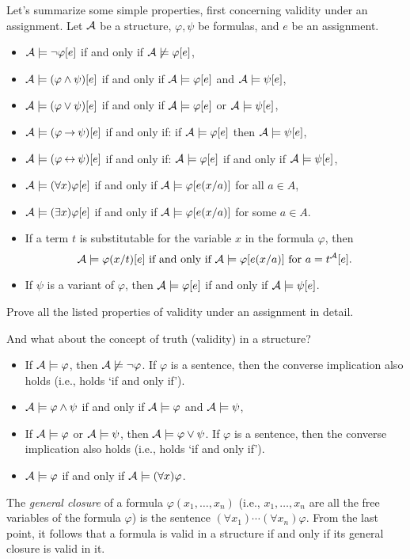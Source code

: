 Let's summarize some simple properties, first concerning validity under an assignment. Let $\mathcal{A}$ be a structure, $\varphi,\psi$ be formulas, and $e$ be an assignment.
\begin{itemize}
    \item $\mathcal{A}\models\neg\varphi[e]$ if and only if $\mathcal{A}\not\models\varphi[e]$,
    \item $\mathcal{A}\models(\varphi\land\psi)[e]$ if and only if $\mathcal{A}\models\varphi[e]$ and $\mathcal{A}\models\psi[e]$,
    \item $\mathcal{A}\models(\varphi\lor\psi)[e]$ if and only if $\mathcal{A}\models\varphi[e]$ or $\mathcal{A}\models\psi[e]$,
    \item $\mathcal{A}\models(\varphi\mathbin{\rightarrow}\psi)[e]$ if and only if: if $\mathcal{A}\models\varphi[e]$ then $\mathcal{A}\models\psi[e]$,
    \item $\mathcal{A}\models(\varphi\mathbin{\leftrightarrow}\psi)[e]$ if and only if: $\mathcal{A}\models\varphi[e]$ if and only if $\mathcal{A}\models\psi[e]$,
    \item $\mathcal{A}\models(\forall x)\varphi[e]$ if and only if $\mathcal{A}\models\varphi[e(x/a)]$ for all $a\in A$,
    \item $\mathcal{A}\models(\exists x)\varphi[e]$ if and only if $\mathcal{A}\models\varphi[e(x/a)]$ for some $a\in A$.
    \item If a term $t$ is substitutable for the variable $x$ in the formula $\varphi$, then
    $$
    \mathcal{A}\models\varphi(x/t)[e]\text{ if and only if }\mathcal{A}\models\varphi[e(x/a)]\text{ for }a=t^{\mathcal{A}}[e].
    $$
    \item If $\psi$ is a variant of $\varphi$, then $\mathcal{A}\models\varphi[e]$ if and only if $\mathcal{A}\models\psi[e]$.
\end{itemize}

\begin{exercise}
    Prove all the listed properties of validity under an assignment in detail.
\end{exercise}

And what about the concept of truth (validity) in a structure?
\begin{itemize}
    \item If $\mathcal{A}\models\varphi$, then $\mathcal{A}\not\models\neg\varphi$. If $\varphi$ is a sentence, then the converse implication also holds (i.e., holds `if and only if').
    \item $\mathcal{A}\models\varphi\land\psi$ if and only if $\mathcal{A}\models\varphi$ and $\mathcal{A}\models\psi$,
    \item If $\mathcal{A}\models\varphi$ or $\mathcal{A}\models\psi$, then $\mathcal{A}\models\varphi\lor\psi$. If $\varphi$ is a sentence, then the converse implication also holds (i.e., holds `if and only if').
    \item $\mathcal{A}\models\varphi$ if and only if $\mathcal{A}\models
    (\forall x)\varphi$.
\end{itemize}
The \emph{general closure} of a formula $\varphi(x_1,\dots,x_n)$ (i.e., $x_1,\dots,x_n$ are all the free variables of the formula $\varphi$) is the sentence $(\forall x_1)\cdots(\forall x_n)\varphi$. From the last point, it follows that a formula is valid in a structure if and only if its general closure is valid in it.

